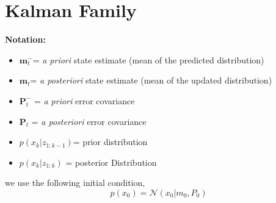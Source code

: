 \documentclass{article}
\renewcommand{\v}[1]{ \ensuremath{ {\mathbf{#1}} }}
\begin{document}





\newpage
\appendix
\section{Kalman Family}\label{APP:Kalman}
\textbf{Notation:}
\\
\begin{itemize}
\item $\v m^-_{t}$= \textit{a priori} state estimate (mean of the predicted distribution)
\item $\v m_t$= \textit{a posteriori} state estimate (mean of the updated distribution)
\item $\v P^-_t$ = \textit{a priori} error covariance
\item $\v P_t$ = \textit{a posteriori} error covariance
\item $p(x_k|z_{1:k-1})$=  prior distribution 
\item $p(x_k | z_{1:k})$ =  posterior Distribution
\end{itemize}
we use the following initial condition,
\begin{equation}
p(x_0) = \mathcal{N}(x_0 | m_0, P_0)
\end{equation}
\end{document}
